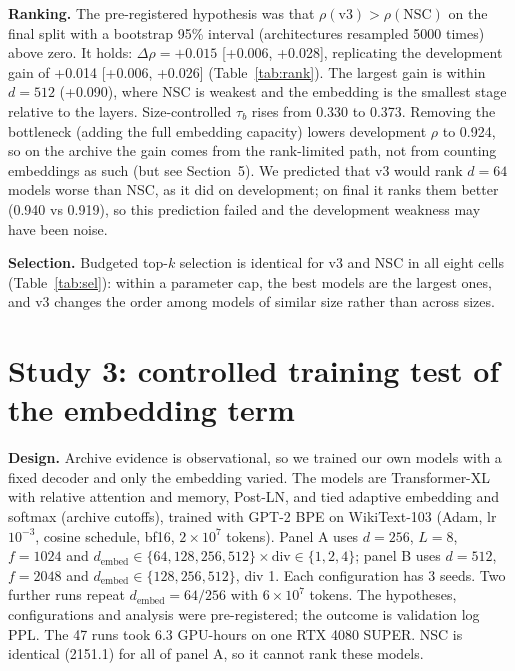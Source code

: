 \documentclass[a4paper,12pt]{article}
\begin{document}
\textbf{Ranking.} The pre-registered hypothesis was that $\rho(\text{v3})>\rho(\text{NSC})$ on the final split with a bootstrap 95\% interval (architectures resampled 5000 times) above zero. It holds: $\Delta\rho=+0.015$ [+0.006, +0.028], replicating the development gain of +0.014 [+0.006, +0.026] (Table~\ref{tab:rank}). The largest gain is within $d=512$ (+0.090), where NSC is weakest and the embedding is the smallest stage relative to the layers. Size-controlled $\tau_b$ rises from 0.330 to 0.373. Removing the bottleneck (adding the full embedding capacity) lowers development $\rho$ to 0.924, so on the archive the gain comes from the rank-limited path, not from counting embeddings as such (but see Section~5). We predicted that v3 would rank $d=64$ models worse than NSC, as it did on development; on final it ranks them better (0.940 vs 0.919), so this prediction failed and the development weakness may have been noise.

\textbf{Selection.} Budgeted top-$k$ selection is identical for v3 and NSC in all eight cells (Table~\ref{tab:sel}): within a parameter cap, the best models are the largest ones, and v3 changes the order among models of similar size rather than across sizes.

\section{Study 3: controlled training test of the embedding term}
\textbf{Design.} Archive evidence is observational, so we trained our own models with a fixed decoder and only the embedding varied. The models are Transformer-XL with relative attention and memory, Post-LN, and tied adaptive embedding and softmax (archive cutoffs), trained with GPT-2 BPE on WikiText-103 (Adam, lr $10^{-3}$, cosine schedule, bf16, $2\times10^7$ tokens). Panel A uses $d=256$, $L=8$, $f=1024$ and $d_{\mathrm{embed}}\in\{64,128,256,512\}\times\text{div}\in\{1,2,4\}$; panel B uses $d=512$, $f=2048$ and $d_{\mathrm{embed}}\in\{128,256,512\}$, div 1. Each configuration has 3 seeds. Two further runs repeat $d_{\mathrm{embed}}=64/256$ with $6\times10^7$ tokens. The hypotheses, configurations and analysis were pre-registered; the outcome is validation log PPL. The 47 runs took 6.3 GPU-hours on one RTX 4080 SUPER. NSC is identical (2151.1) for all of panel A, so it cannot rank these models.
\end{document}
